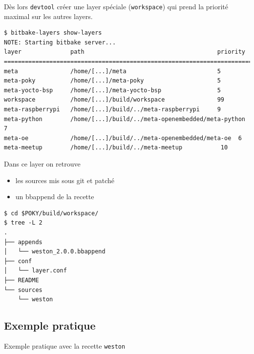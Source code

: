 \documentclass[compress]{smilebeamer}
\begin{document}
\begin{frame}[fragile]
Dès lors \texttt{devtool} créer une layer spéciale (\texttt{workspace}) qui prend la priorité maximal sur les autres layers.
\begin{lstlisting}[style=shell,breaklines=false,xleftmargin=-18px,xrightmargin=-18px]
$ bitbake-layers show-layers
NOTE: Starting bitbake server...
layer              path                                      priority
=========================================================================
meta               /home/[...]/meta                          5
meta-poky          /home/[...]/meta-poky                     5
meta-yocto-bsp     /home/[...]/meta-yocto-bsp                5
workspace          /home/[...]/build/workspace               99
meta-raspberrypi   /home/[...]/build/../meta-raspberrypi     9
meta-python        /home/[...]/build/../meta-openembedded/meta-python  7
meta-oe            /home/[...]/build/../meta-openembedded/meta-oe  6
meta-meetup        /home/[...]/build/../meta-meetup           10
\end{lstlisting}
\end{frame}

\begin{frame}[fragile]
Dans ce layer on retrouve
\begin{itemize}
	\item les sources mis sous git et patché
	\item un bbappend de la recette
\end{itemize}
\begin{lstlisting}[style=shell]
$ cd $POKY/build/workspace/
$ tree -L 2 
.
├── appends
│   └── weston_2.0.0.bbappend
├── conf
│   └── layer.conf
├── README
└── sources
    └── weston
\end{lstlisting}
\end{frame}

\subsection{Exemple pratique}

\begin{frame}
\begin{center}
\textcolor{smileOrange}{\huge{Exemple pratique avec la recette \texttt{weston}}}
\end{center}
\end{frame}
\end{document}
